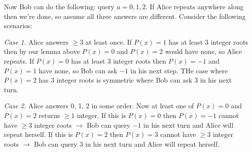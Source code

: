 \documentclass[11pt,a4paper]{article}
\begin{document}
\begin{enumerate}
	Now Bob can do the following: query $a=0, 1, 2$. 
	If Alice repeats anywhere along then we're done, so assume all three answers are different. 
	Consider the following scenarios: 
	
	\emph{Case 1.} Alice answers $\ge 3$ at least once. 
	If $P(x)=1$ has at least 3 integer roots then by our  lemma above $P(x)=0$ and $P(x)=2$ would have none, 
	so Alice repeats. 
	If $P(x)=0$ has at least 3 integer roots then $P(x)=-1$ and $P(x)=1$ have none, 
	so Bob can ask $-1$ in his next step. 
	THe case where $P(x)=2$ has 3 integer roots is symmetric where Bob can ask 3 in his next turn. 
	
	\emph{Case 2.} Alice answers 0, 1, 2 in some order. 
	Now at least one of $P(x)=0$ and $P(x)=2$ returns $\ge 1$ integer. 
	If this is $P(x)=0$ then $P(x)=-1$ cannot have $\ge 3$ integer roots $\to$ Bob can query $-1$ in his next turn and Alice will repeat herself. 
	If this is $P(x)=2$ then $P(x)=3$ cannot have $\ge 3$ integer roots $\to$ Bob can query $3$ in his next turn and Alice will repeat herself. 

\end{enumerate}
\end{document}
